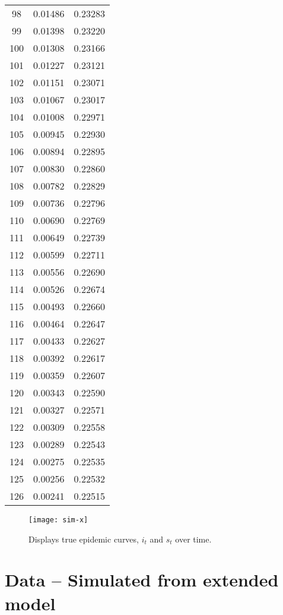 \documentclass{elsarticle}
\begin{document}
\begin{center}
\begin{longtable}{|c|cc|}
  98 & 0.01486 & 0.23283 \\
  99 & 0.01398 & 0.23220 \\
  100 & 0.01308 & 0.23166 \\
  101 & 0.01227 & 0.23121 \\
  102 & 0.01151 & 0.23071 \\
  103 & 0.01067 & 0.23017 \\
  104 & 0.01008 & 0.22971 \\
  105 & 0.00945 & 0.22930 \\
  106 & 0.00894 & 0.22895 \\
  107 & 0.00830 & 0.22860 \\
  108 & 0.00782 & 0.22829 \\
  109 & 0.00736 & 0.22796 \\
  110 & 0.00690 & 0.22769 \\
  111 & 0.00649 & 0.22739 \\
  112 & 0.00599 & 0.22711 \\
  113 & 0.00556 & 0.22690 \\
  114 & 0.00526 & 0.22674 \\
  115 & 0.00493 & 0.22660 \\
  116 & 0.00464 & 0.22647 \\
  117 & 0.00433 & 0.22627 \\
  118 & 0.00392 & 0.22617 \\
  119 & 0.00359 & 0.22607 \\
  120 & 0.00343 & 0.22590 \\
  121 & 0.00327 & 0.22571 \\
  122 & 0.00309 & 0.22558 \\
  123 & 0.00289 & 0.22543 \\
  124 & 0.00275 & 0.22535 \\
  125 & 0.00256 & 0.22532 \\
  126 & 0.00241 & 0.22515
\label{fig:x}
\end{longtable}
\end{center}

\clearpage

\begin{figure}[ht]
\texttt{[image: sim-x]}
\caption{Displays true epidemic curves, $i_t$ and $s_t$ over time.}
\end{figure}

\clearpage

\section{Data -- Simulated from extended model}
\end{document}

